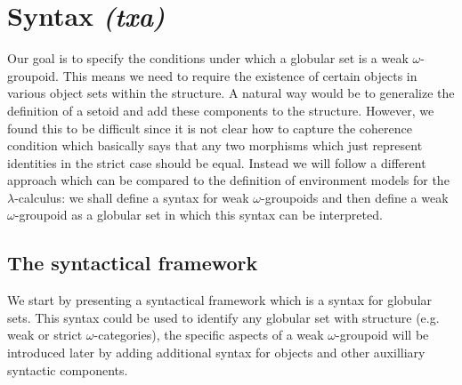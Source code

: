 \section{Syntax \textit{(txa)}}\label{sec:syntax}


Our goal is to specify the conditions under which a globular set is a
weak $\omega$-groupoid. This means we need to require the existence of
certain objects in various object sets within the structure. A natural
way would be to generalize the definition of a setoid and add these
components to the structure. However, we found this to be difficult
since it is not clear how to capture the coherence condition which
basically says that any two morphisms which just represent identities
in the strict case should be equal. Instead we will follow a different
approach which can be compared to the definition of environment models
for the $\lambda$-calculus: we shall define a syntax for weak
$\omega$-groupoids and then define a weak $\omega$-groupoid as a
globular set in which this syntax can be interpreted.

\subsection{The syntactical framework}
\label{sec:syntactical-framework}

We start by presenting a syntactical framework which is a syntax for
globular sets. This syntax could be used to identify any globular set
with structure (e.g. weak or strict $\omega$-categories), the specific
aspects of a weak $\omega$-groupoid will be introduced later by adding
additional syntax for objects and other auxilliary syntactic
components. 

